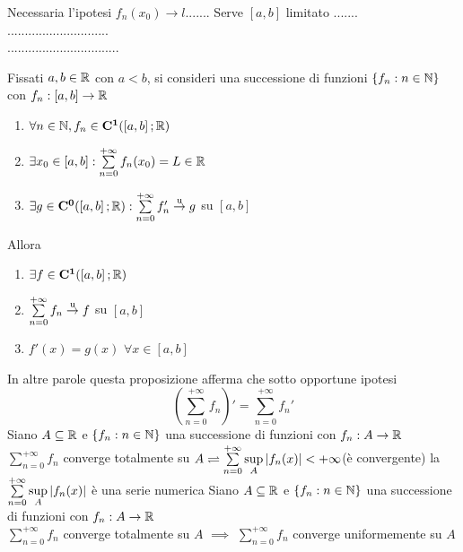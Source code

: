 \observation
Necessaria l'ipotesi $f_n(x_0)\to l$.......
\observation
Serve $\left[a,b\right]$ limitato .......\\
.............................\\
................................\\
\begin{corollary}
	\label{coro:deriv_series_series_of_deriv}
	Fissati $a,b\in \mathbb{R}$ con $a<b$, si consideri una successione di funzioni $\left\{f_n:n\in\mathbb{N}\right\}$ con $f_n:\left[a,b\right]\to \mathbb{R}$
	\begin{enumerate}
		\item $\forall n\in\mathbb{N}, f_n\in \mathbf{C^{1}}(\left[a,b\right]; \mathbb{R})$
		\item $\exists x_0\in\left[a,b\right]: \sum\limits_{n=0}^{+\infty}f_n(x_0)=L\in \mathbb{R}$
		\item $\exists g \in \mathbf{C^{0}}(\left[a,b\right]; \mathbb{R}): \sum\limits_{n=0}^{+\infty}f'_n \overset{\text{u}}{\to} g$ su $\left[a,b\right]$
	\end{enumerate}
	Allora
	\begin{enumerate}
		\item $\exists f\in \mathbf{C^{1}}(\left[a,b\right]; \mathbb{R})$
		\item $\sum\limits_{n=0}^{+\infty}f_n \overset{\text{u}}{\to} f$ su $\left[a,b\right]$
		\item $f'(x)=g(x)$ $\forall x\in\left[a,b\right]$
	\end{enumerate}
\end{corollary}
\observation
In altre parole questa proposizione afferma che sotto opportune ipotesi
\[\left(\sum\limits_{n=0}^{+\infty} f_n \right)' =  \sum\limits_{n=0}^{+\infty}f_n'\]
Siano $A\subseteq  \mathbb{R}$ e $\left\{f_n:n\in\mathbb{N}\right\}$ una successione di funzioni con $f_n:A\to \mathbb{R}$\\
$\sum\limits_{n=0}^{+\infty}f_n$ converge totalmente su $A \rightleftharpoons \sum\limits_{n=0}^{+\infty}\sup\limits_{A}\left|f_n(x)\right|<+\infty$(è convergente)
\observation
la $\sum\limits_{n=0}^{+\infty}\sup\limits_{A}\left|f_n(x)\right|$ è una serie numerica
\proposition
Siano $A\subseteq \mathbb{R}$ e $\left\{f_n:n\in\mathbb{N}\right\}$ una successione di funzioni con $f_n:A\to \mathbb{R}$\\
$\sum\limits_{n=0}^{+\infty}f_n$ converge totalmente su $A$ $\implies$  $\sum\limits_{n=0}^{+\infty}f_n$ converge uniformemente su $A$
